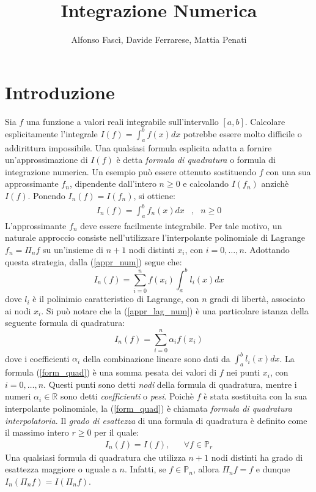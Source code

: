 \documentclass[10pt]{amsart}
\title[Formule di Quadratura]{Integrazione Numerica}
\author[A. Fasc\`i, D. Ferrarese, M. Penati]{Alfonso Fasc\`i, Davide Ferrarese, Mattia Penati}
\begin{document}
\maketitle

\section{Introduzione}
Sia $f$ una funzione a valori reali integrabile sull'intervallo $[a,b]$. Calcolare esplicitamente l'integrale $I(f)= \int_a^b f(x) dx$ potrebbe essere molto difficile o addirittura impossibile. Una qualsiasi formula esplicita adatta a fornire un'approssimazione di $I(f)$ \`e detta {\it formula di quadratura} o {formula di integrazione numerica}. Un esempio pu\`o essere ottenuto sostituendo $f$ con una sua approssimante $f_n$, dipendente dall'intero $n \ge 0$ e calcolando $I(f_n)$ anzich\`e $I(f)$. Ponendo $I_n(f) = I(f_n)$, si ottiene:
\begin{eqnarray}
\label{appr_num}
I_n(f)=\int_a^b f_n(x) dx & , & n \ge 0
\end{eqnarray}
L'approssimante $f_n$ deve essere facilmente integrabile. Per tale motivo, un naturale approccio consiste nell'utilizzare l'interpolante polinomiale di Lagrange $f_n=\Pi_n f$ su un'insieme di $n+1$ nodi distinti ${x_i}$, con $i=0,\dots, n$. Adottando questa strategia, dalla (\ref{appr_num}) segue che:
\begin{equation}
\label{appr_lag_num}
I_n(f)=\sum_{i=0}^n f(x_i)\int_a^b l_i(x)dx
\end{equation}
dove $l_i$ \`e il polinimio caratteristico di Lagrange, con $n$ gradi di libert\`a, associato ai nodi $x_i$. Si pu\`o notare che la (\ref{appr_lag_num}) \`e una particolare istanza della seguente formula di quadratura:
\begin{equation}
\label{form_quad}
I_n(f)=\sum_{i=0}^n \alpha_i f(x_i)
\end{equation}
dove i coefficienti $\alpha_i$ della combinazione lineare sono dati da $\int_a^b l_i(x) dx$. La formula (\ref{form_quad}) \`e una somma pesata dei valori di $f$ nei punti $x_i$, con $i=0, \dots, n$. Questi punti sono detti {\it nodi} della formula di quadratura, mentre i numeri $\alpha_i \in \mathbb{R}$ sono detti {\it coefficienti} o {\it pesi}. Poich\`e $f$ \`e stata sostituita con la sua interpolante polinomiale, la (\ref{form_quad}) \`e chiamata {\it formula di quadratura interpolatoria}. Il {\it grado di esattezza} di una formula di quadratura \`e definito come il massimo intero $r \ge 0$ per il quale:
\begin{eqnarray}
I_n(f)=I(f), & & \forall f \in \mathbb{P}_r
\end{eqnarray} 
Una qualsiasi formula di quadratura che utilizza $n+1$ nodi distinti ha grado di esattezza maggiore o uguale a $n$. Infatti, se $f \in \mathbb{P}_n$, allora $\Pi_n f = f$ e dunque $I_n(\Pi_n f)=I(\Pi_n f)$.
\end{document}

